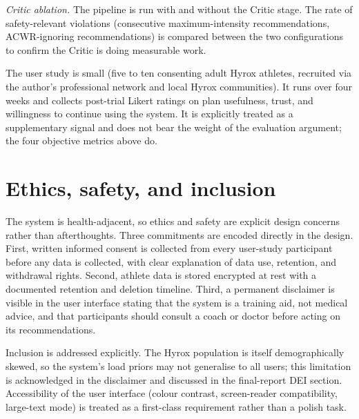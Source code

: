 \emph{Critic ablation.} The pipeline is run with and without the Critic stage. The rate of safety-relevant violations (consecutive maximum-intensity recommendations, ACWR-ignoring recommendations) is compared between the two configurations to confirm the Critic is doing measurable work.

The user study is small (five to ten consenting adult Hyrox athletes, recruited via the author's professional network and local Hyrox communities). It runs over four weeks and collects post-trial Likert ratings on plan usefulness, trust, and willingness to continue using the system. It is explicitly treated as a supplementary signal and does not bear the weight of the evaluation argument; the four objective metrics above do.

\section{Ethics, safety, and inclusion}

The system is health-adjacent, so ethics and safety are explicit design concerns rather than afterthoughts. Three commitments are encoded directly in the design. First, written informed consent is collected from every user-study participant before any data is collected, with clear explanation of data use, retention, and withdrawal rights. Second, athlete data is stored encrypted at rest with a documented retention and deletion timeline. Third, a permanent disclaimer is visible in the user interface stating that the system is a training aid, not medical advice, and that participants should consult a coach or doctor before acting on its recommendations.

Inclusion is addressed explicitly. The Hyrox population is itself demographically skewed, so the system's load priors may not generalise to all users; this limitation is acknowledged in the disclaimer and discussed in the final-report DEI section. Accessibility of the user interface (colour contrast, screen-reader compatibility, large-text mode) is treated as a first-class requirement rather than a polish task.
